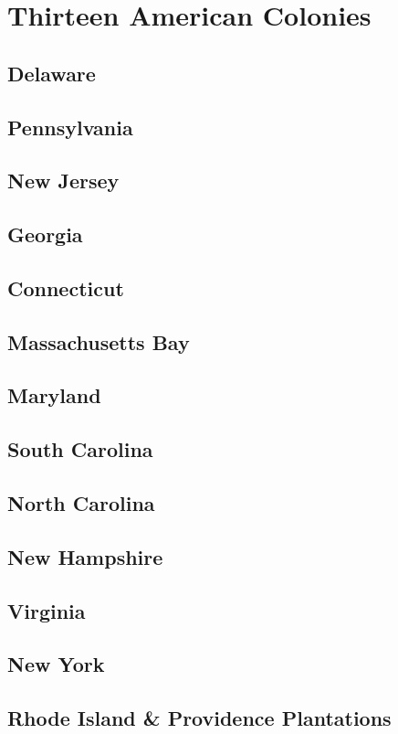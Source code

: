 \section{Thirteen American Colonies}

\subsection*{Delaware}

\subsection*{Pennsylvania}

\subsection*{New Jersey}

\subsection*{Georgia}

\subsection*{Connecticut}

\subsection*{Massachusetts Bay}

\subsection*{Maryland}

\subsection*{South Carolina}

\subsection*{North Carolina}

\subsection*{New Hampshire}

\subsection*{Virginia}

\subsection*{New York}

\subsection*{Rhode Island \& Providence Plantations}

